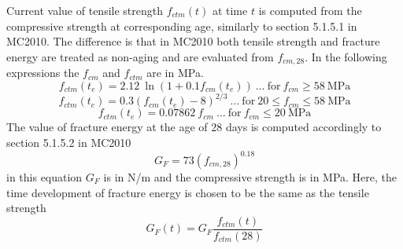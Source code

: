 \documentclass[a4paper]{article}
\begin{document}
Current value of tensile strength $f_{ctm}(t)$ at time $t$ is computed from the compressive
strength at corresponding age, similarly to section 5.1.5.1 in
MC2010. The difference is that in MC2010 both tensile strength and fracture energy
are treated as non-aging and are evaluated from $f_{cm,28}$. 
In the following expressions the $f_{cm}$ and $f_{ctm}$ are in MPa.
\begin{equation}
f_{ctm}(t_e) = 2.12 \: \ln \left(1 + 0.1 f_{cm}(t_e) \right) \: \dots \:
\mathrm{for \:} f_{cm} \geq 58\:\mathrm{MPa}
\end{equation}  
%
\begin{equation}
f_{ctm}(t_e) = 0.3 \left(f_{cm}(t_e)-8 \right)^{2/3} \: \dots \:
\mathrm{for \:} 20 \leq f_{cm} \leq 58\:\mathrm{MPa}
\end{equation}  
%
\begin{equation}
f_{ctm}(t_e) = 0.07862 \: f_{cm} \: \dots \:
\mathrm{for \:} f_{cm} \leq 20 \: \mathrm{MPa}
\end{equation}
%
The value of fracture energy at the age of 28 days is computed
accordingly to section 5.1.5.2 in MC2010
\begin{equation}
G_F = 73 \left( f_{cm,28} \right)^{0.18}
\end{equation} 
%
in this equation $G_F$ is in N/m and the compressive strength is in MPa.
%
Here, the time development of fracture energy is chosen to be the same as
the tensile strength
\begin{equation}
G_F(t) = G_F \frac{f_{ctm}(t)}{f_{ctm}(28)}
\end{equation} 
\end{document}
